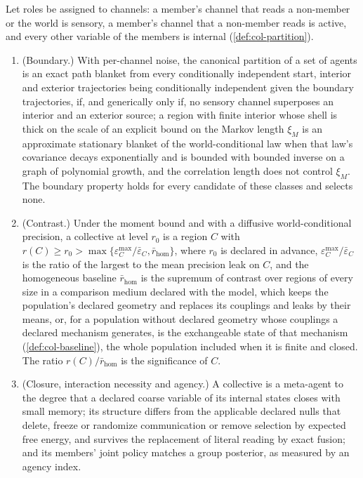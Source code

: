 \begin{hypothesis}\label{hyp:int-h1}
Let roles be assigned to channels: a member's channel that reads a non-member or the world is sensory, a member's channel that a non-member reads is active, and every other variable of the members is internal (\cref{def:col-partition}).
\begin{enumerate}
\item[(a)] (Boundary.) With per-channel noise, the canonical partition of a set of agents is an exact path blanket from every conditionally independent start, interior and exterior trajectories being conditionally independent given the boundary trajectories, if, and generically only if, no sensory channel superposes an interior and an exterior source; a region with finite interior whose shell is thick on the scale of an explicit bound on the Markov length $\xi_M$ is an approximate stationary blanket of the world-conditional law when that law's covariance decays exponentially and is bounded with bounded inverse on a graph of polynomial growth, and the correlation length does not control $\xi_M$. The boundary property holds for every candidate of these classes and selects none.
\item[(b)] (Contrast.) Under the moment bound and with a diffusive world-conditional precision, a collective at level $r_0$ is a region $C$ with $r(C)\ge r_0>\max\{\varepsilon^{\max}_C/\bar\varepsilon_C,\bar r_{\mathrm{hom}}\}$, where $r_0$ is declared in advance, $\varepsilon^{\max}_C/\bar\varepsilon_C$ is the ratio of the largest to the mean precision leak on $C$, and the homogeneous baseline $\bar r_{\mathrm{hom}}$ is the supremum of contrast over regions of every size in a comparison medium declared with the model, which keeps the population's declared geometry and replaces its couplings and leaks by their means, or, for a population without declared geometry whose couplings a declared mechanism generates, is the exchangeable state of that mechanism (\cref{def:col-baseline}), the whole population included when it is finite and closed. The ratio $r(C)/\bar r_{\mathrm{hom}}$ is the significance of $C$.
\item[(c)] (Closure, interaction necessity and agency.) A collective is a meta-agent to the degree that a declared coarse variable of its internal states closes with small memory; its structure differs from the applicable declared nulls that delete, freeze or randomize communication or remove selection by expected free energy, and survives the replacement of literal reading by exact fusion; and its members' joint policy matches a group posterior, as measured by an agency index.
\end{enumerate}
\end{hypothesis}

